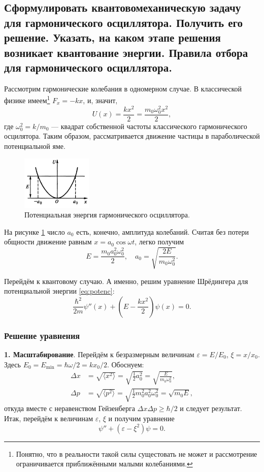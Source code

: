 \subsection{Сформулировать квантовомеханическую задачу для гармонического осциллятора. Получить
его решение. Указать, на каком этапе решения возникает квантование энергии. Правила отбора
для гармонического осциллятора.}
Рассмотрим гармонические колебания в одномерном случае. В классической физике
имеем\footnote{Понятно, что в реальности такой силы сущестовать не может и
рассмотрение ограничивается приближёнными малыми колебаниями.} $ F_x = -kx $, и, значит,  
\begin{equation}
    U(x) = \frac{kx^2}{2} = \frac{m_0\omega_0^2 x^2}{2},
    \label{eq:potenc}
\end{equation}
где $ \omega_0^2 = k/m_0 $ --- квадрат собственной частоты классического
гармонического осцилятора. Таким образом, рассматривается движение частицы в
параболической потенциальной яме. 
\begin{figure}[h]
  \centering
  \includegraphics[width=0.3\textwidth]{img/write-02/yama.png}
  \caption{Потенциальная энергия гармонического осциллятора.}
  \label{fig:yama}
\end{figure}
На рисунке \ref{fig:yama} число $ a_0 $ есть, конечно,
амплитуда колебаний. Считая без потери общности движение равным $ x = a_0 \cos\omega t $, легко
получим 
\[
    E = \frac{m_0a_0^2\omega_0^2}{2}, \quad a_0 =
    \sqrt{\frac{2E}{m_0\omega_0^2}}.
\]

Перейдём к квантовому случаю. А именно, решим уравнение Шрёдингера
для потенциальной энергии \eqref{eq:potenc}: 
\[
    \frac{\hbar^2}{2m} \psi''(x) + \left(E - \frac{kx^2}{2}\right) \psi(x) = 0.
\]

\subsubsection{Решение уравнения}
\textbf{1. Масштабирование}. Перейдём к безразмерным величинам $ \varepsilon =
E/E_0 $, $ \xi = x/x_0 $. Здесь $ E_0 = E_{\min} = \hbar \omega/2 = kx_0/2 $.
Обоснуем: 
\begin{align*}
  \Delta x &= \sqrt{\langle x^2\rangle} = \sqrt{\frac{1}{2} a_0^2} =
  \sqrt{\frac{E}{m_0\omega_0^2}},\\
  \Delta p &= \sqrt{\langle p^2 \rangle} =
  \sqrt{\frac{1}{2}m_0^2a_0^2\omega_0^2} = \sqrt{m_0E},
\end{align*}
откуда вместе с неравенством Гейзенберга $ \Delta x \Delta p \geqslant \hbar/2 $
и следует результат. Итак, перейдём к величинам $ \varepsilon $, $ \xi $ и
получим уравнение
\begin{equation}
  \psi'' + (\varepsilon - \xi^2)\psi = 0.  
  \label{eq:eq1}
\end{equation}

